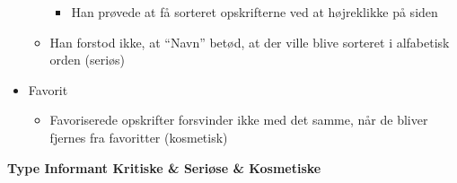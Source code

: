 \begin{itemize}
\begin{itemize}
   \begin{itemize}
   \item Han prøvede at få sorteret opskrifterne ved at højreklikke på siden
   \end{itemize}
  \item Han forstod ikke, at “Navn” betød, at der ville blive sorteret i alfabetisk orden (seriøs)
  \end{itemize}
 \item Favorit
  \begin{itemize}
  \item Favoriserede opskrifter forsvinder ikke med det samme, når de bliver fjernes fra favoritter (kosmetisk)
  \end{itemize}
\end{itemize}


\textbf{
           						 {Type}
       {Informant             	}{Kritiske   & Seriøse   & Kosmetiske}{
}
}
